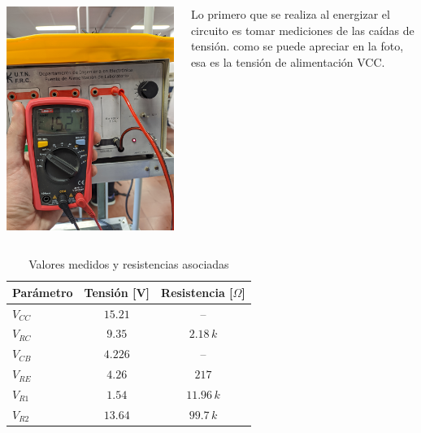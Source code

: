 \begin{frame}{}
  \begin{columns}[c] %
      \centering
      \includegraphics[width=\linewidth]{pictures/VCC.jpg}

      \justifying
        Lo primero que se realiza al energizar el circuito es tomar mediciones de las caídas de tensión. como se puede
        apreciar en la foto, esa es la tensión de alimentación VCC. 
      
  \end{columns}
\end{frame}

\begin{frame}{}
  \begin{table}[H]
    \centering
    \caption{Valores medidos y resistencias asociadas}
    \begin{tabular}{lcc}
    \toprule
    \textbf{Parámetro} & \textbf{Tensión [V]} & \textbf{Resistencia [\(\Omega\)]} \\
    \midrule
    $V_{CC}$ & $15.21$ & -- \\
    $V_{RC}$ & $9.35$  & $2.18\,k$ \\
    $V_{CB}$ & $4.226$ & -- \\
    $V_{RE}$ & $4.26$  & $217$ \\
    $V_{R1}$ & $1.54$  & $11.96\,k$ \\
    $V_{R2}$ & $13.64$ & $99.7\,k$ \\
    \bottomrule
    \end{tabular}
  \end{table}
\end{frame}


